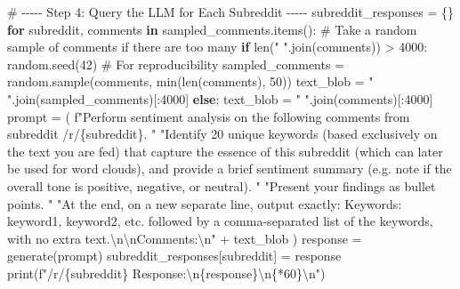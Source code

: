 \documentclass[
  12pt,
  letterpaper,
  DIV=11,
  numbers=noendperiod]{scrartcl}
\newenvironment{Shaded}{\begin{snugshade}}{\end{snugshade}}
\newcommand{\BuiltInTok}[1]{\textcolor[rgb]{0.00,0.23,0.31}{#1}}
\newcommand{\CharTok}[1]{\textcolor[rgb]{0.13,0.47,0.30}{#1}}
\newcommand{\CommentTok}[1]{\textcolor[rgb]{0.37,0.37,0.37}{#1}}
\newcommand{\ControlFlowTok}[1]{\textcolor[rgb]{0.00,0.23,0.31}{\textbf{#1}}}
\newcommand{\DecValTok}[1]{\textcolor[rgb]{0.68,0.00,0.00}{#1}}
\newcommand{\KeywordTok}[1]{\textcolor[rgb]{0.00,0.23,0.31}{\textbf{#1}}}
\newcommand{\NormalTok}[1]{\textcolor[rgb]{0.00,0.23,0.31}{#1}}
\newcommand{\OperatorTok}[1]{\textcolor[rgb]{0.37,0.37,0.37}{#1}}
\newcommand{\SpecialCharTok}[1]{\textcolor[rgb]{0.37,0.37,0.37}{#1}}
\newcommand{\SpecialStringTok}[1]{\textcolor[rgb]{0.13,0.47,0.30}{#1}}
\newcommand{\StringTok}[1]{\textcolor[rgb]{0.13,0.47,0.30}{#1}}
\begin{document}
\begin{Shaded}
\begin{Highlighting}[]
\CommentTok{\# {-}{-}{-}{-}{-} Step 4: Query the LLM for Each Subreddit {-}{-}{-}{-}{-}}
\NormalTok{subreddit\_responses }\OperatorTok{=}\NormalTok{ \{\}}
\ControlFlowTok{for}\NormalTok{ subreddit, comments }\KeywordTok{in}\NormalTok{ sampled\_comments.items():}
    \CommentTok{\# Take a random sample of comments if there are too many}
    \ControlFlowTok{if} \BuiltInTok{len}\NormalTok{(}\StringTok{" "}\NormalTok{.join(comments)) }\OperatorTok{\textgreater{}} \DecValTok{4000}\NormalTok{:}
\NormalTok{        random.seed(}\DecValTok{42}\NormalTok{)  }\CommentTok{\# For reproducibility}
\NormalTok{        sampled\_comments }\OperatorTok{=}\NormalTok{ random.sample(comments, }\BuiltInTok{min}\NormalTok{(}\BuiltInTok{len}\NormalTok{(comments), }\DecValTok{50}\NormalTok{))}
\NormalTok{        text\_blob }\OperatorTok{=} \StringTok{" "}\NormalTok{.join(sampled\_comments)[:}\DecValTok{4000}\NormalTok{]}
    \ControlFlowTok{else}\NormalTok{:}
\NormalTok{        text\_blob }\OperatorTok{=} \StringTok{" "}\NormalTok{.join(comments)[:}\DecValTok{4000}\NormalTok{]}
\NormalTok{    prompt }\OperatorTok{=}\NormalTok{ (}
        \SpecialStringTok{f"Perform sentiment analysis on the following comments from subreddit /r/}\SpecialCharTok{\{}\NormalTok{subreddit}\SpecialCharTok{\}}\SpecialStringTok{. "}
        \StringTok{"Identify 20 unique keywords (based exclusively on the text you are fed) that capture the essence of this subreddit (which can later be used for word clouds), and provide a brief sentiment summary (e.g. note if the overall tone is positive, negative, or neutral). "}
        \StringTok{"Present your findings as bullet points. "}
        \StringTok{"At the end, on a new separate line, output exactly: \textquotesingle{}Keywords: keyword1, keyword2, etc.\textquotesingle{} followed by a comma{-}separated list of the keywords, with no extra text.}\CharTok{\textbackslash{}n\textbackslash{}n}\StringTok{Comments:}\CharTok{\textbackslash{}n}\StringTok{"} 
        \OperatorTok{+}\NormalTok{ text\_blob}
\NormalTok{    )}
\NormalTok{    response }\OperatorTok{=}\NormalTok{ generate(prompt)}
\NormalTok{    subreddit\_responses[subreddit] }\OperatorTok{=}\NormalTok{ response}
    \BuiltInTok{print}\NormalTok{(}\SpecialStringTok{f"/r/}\SpecialCharTok{\{}\NormalTok{subreddit}\SpecialCharTok{\}}\SpecialStringTok{ Response:}\CharTok{\textbackslash{}n}\SpecialCharTok{\{}\NormalTok{response}\SpecialCharTok{\}}\CharTok{\textbackslash{}n}\SpecialCharTok{\{}\StringTok{\textquotesingle{}{-}\textquotesingle{}}\OperatorTok{*}\DecValTok{60}\SpecialCharTok{\}}\CharTok{\textbackslash{}n}\SpecialStringTok{"}\NormalTok{)}


\end{Highlighting}
\end{Shaded}
\end{document}
